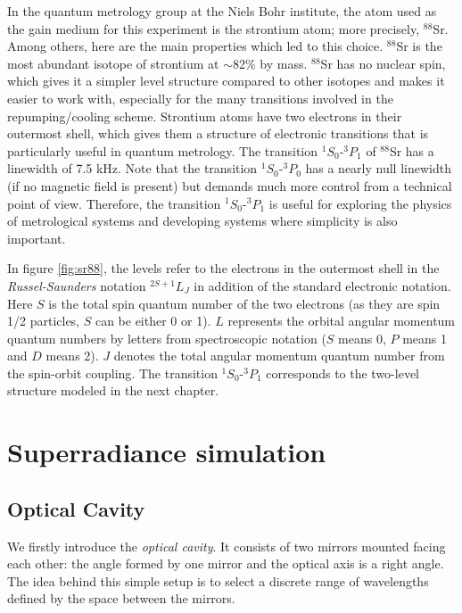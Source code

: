 \documentclass[11pt]{report}
\begin{document}
In the quantum metrology group at the Niels Bohr institute, the atom used as the gain medium for this experiment is the strontium atom; more precisely, $^{88}$Sr. Among others, here are the main properties which led to this choice. $^{88}$Sr is the most abundant isotope of strontium at $\sim$82\% by mass. $^{88}$Sr has no nuclear spin, which gives it a simpler level structure compared to other isotopes and makes it easier to work with, especially for the many transitions involved in the repumping/cooling scheme. Strontium atoms have two electrons in their outermost shell, which gives them a structure of electronic transitions that is particularly useful in quantum metrology. The transition  $^1S_0$-$^3P_1$ of $^{88}$Sr has a linewidth of 7.5 kHz. Note that the transition $^1S_0$-$^3P_0$ has a nearly null linewidth (if no magnetic field is present) but demands much more control from a technical point of view. Therefore, the transition $^1S_0$-$^3P_1$ is useful for exploring the physics of metrological systems and developing systems where simplicity is also important.

In figure \ref{fig:sr88}, the levels refer to the electrons in the outermost shell in the \textit{Russel-Saunders} notation $^{2S+1}L_J$ in addition of the standard electronic notation. Here $S$ is the total spin quantum number of the two electrons (as they are spin 1/2 particles, $S$ can be either 0 or 1). $L$ represents the orbital angular momentum quantum numbers by letters from spectroscopic notation ($S$ means 0, $P$ means 1 and $D$ means 2). $J$ denotes the total angular momentum quantum number from the spin-orbit coupling. The transition $^1S_0$-$^3P_1$ corresponds to the two-level structure modeled in the next chapter.



\chapter{Superradiance simulation}
\section{Optical Cavity}

We firstly introduce the \textit{optical cavity}. It consists of two mirrors mounted facing each other: the angle formed by one mirror and the optical axis is a right angle. The idea behind this simple setup is to select a discrete range of wavelengths defined by the space between the mirrors. 
\end{document}
